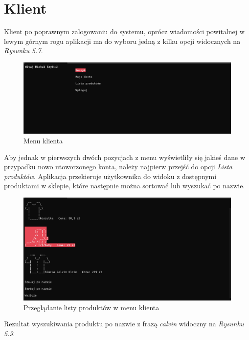 \section{Klient}

Klient po poprawnym zalogowaniu do systemu, oprócz wiadomości powitalnej w lewym górnym rogu aplikacji ma do wyboru jedną z kilku opcji widocznych na \textit{Rysunku 5.7}. 

\begin{figure}[H]
	\centering
		\includegraphics[width=15cm]{screeny/klient_menu.png}
	\caption{\footnotesize Menu klienta}
	\label{fig:plotend}
\end{figure}

Aby jednak w pierwszych dwóch pozycjach z menu wyświetliły się jakieś dane w przypadku nowo utoworzonego konta, należy najpierw przejść do opcji \textit{Lista produktów}. Aplikacja przekieruje użytkownika do widoku z dostępnymi produktami w sklepie, które następnie można sortować lub wyszukać po nazwie. 

\begin{figure}[H]
	\centering
		\includegraphics[width=15cm]{screeny/sklep_klient.png}
	\caption{\footnotesize Przeglądanie listy produktów w menu klienta}
	\label{fig:plotend}
\end{figure}

Rezultat wyszukiwania produktu po nazwie z frazą \textit{calvin} widoczny na \textit{Rysunku 5.9}.
	
